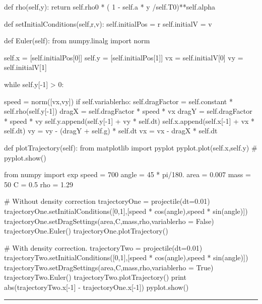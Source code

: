 \begin{enumerate}
\begin{codeexample}
\begin{VerbatimOut}{\listingFile}
    def rho(self,y):
        return self.rho0 * ( 1 - self.a * y /self.T0)**self.alpha
    
    def setInitialConditions(self,r,v):
        self.initialPos = r
        self.initialV = v

    def Euler(self):
        from numpy.linalg import norm
        
        self.x = [self.initialPos[0]]
        self.y = [self.initialPos[1]]
        vx = self.initialV[0]
        vy = self.initialV[1]
        
        while self.y[-1] > 0:

            speed = norm([vx,vy])
            if self.variablerho:
                self.dragFactor = self.constant * self.rho(self.y[-1])
            dragX = self.dragFactor * speed * vx
            dragY = self.dragFactor * speed * vy
            self.y.append(self.y[-1] + vy * self.dt)
            self.x.append(self.x[-1] + vx * self.dt)
            vy = vy - (dragY + self.g) * self.dt
            vx = vx - dragX * self.dt

    def plotTrajectory(self):
        from matplotlib import pyplot
        pyplot.plot(self.x,self.y)
        # pyplot.show()


from numpy import exp
speed = 700
angle = 45 * pi/180.
area = 0.007
mass = 50
C = 0.5
rho = 1.29

# Without density correction
trajectoryOne = projectile(dt=0.01)
trajectoryOne.setInitialConditions([0,1],[speed * cos(angle),speed * sin(angle)])
trajectoryOne.setDragSettings(area,C,mass,rho,variablerho = False)
trajectoryOne.Euler()
trajectoryOne.plotTrajectory()

# With density correction.
trajectoryTwo = projectile(dt=0.01)
trajectoryTwo.setInitialConditions([0,1],[speed * cos(angle),speed * sin(angle)])
trajectoryTwo.setDragSettings(area,C,mass,rho,variablerho = True)
trajectoryTwo.Euler()
trajectoryTwo.plotTrajectory()
print abs(trajectoryTwo.x[-1] - trajectoryOne.x[-1]) 
pyplot.show()

\end{VerbatimOut}
\end{codeexample}
\else
\noindent\rule{4 in}{0.01 in}
\fi

\end{enumerate}